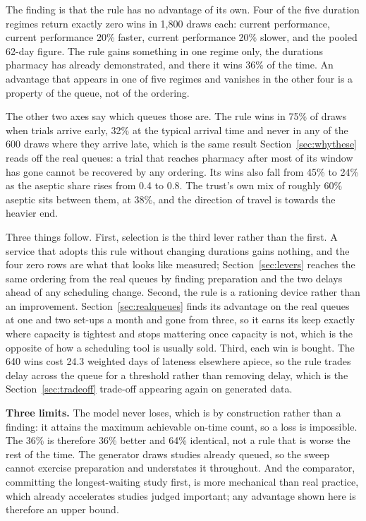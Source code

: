 The finding is that the rule has no advantage of its own. Four of the five duration regimes return exactly zero wins in 1,800 draws each: current performance, current performance 20\% faster, current performance 20\% slower, and the pooled 62-day figure. The rule gains something in one regime only, the durations pharmacy has already demonstrated, and there it wins 36\% of the time. An advantage that appears in one of five regimes and vanishes in the other four is a property of the queue, not of the ordering.

The other two axes say which queues those are. The rule wins in 75\% of draws when trials arrive early, 32\% at the typical arrival time and never in any of the 600 draws where they arrive late, which is the same result Section~\ref{sec:whythese} reads off the real queues: a trial that reaches pharmacy after most of its window has gone cannot be recovered by any ordering. Its wins also fall from 45\% to 24\% as the aseptic share rises from 0.4 to 0.8. The trust's own mix of roughly 60\% aseptic sits between them, at 38\%, and the direction of travel is towards the heavier end.

Three things follow. First, selection is the third lever rather than the first. A service that adopts this rule without changing durations gains nothing, and the four zero rows are what that looks like measured; Section~\ref{sec:levers} reaches the same ordering from the real queues by finding preparation and the two delays ahead of any scheduling change. Second, the rule is a rationing device rather than an improvement. Section~\ref{sec:realqueues} finds its advantage on the real queues at one and two set-ups a month and gone from three, so it earns its keep exactly where capacity is tightest and stops mattering once capacity is not, which is the opposite of how a scheduling tool is usually sold. Third, each win is bought. The 640 wins cost 24.3 weighted days of lateness elsewhere apiece, so the rule trades delay across the queue for a threshold rather than removing delay, which is the Section~\ref{sec:tradeoff} trade-off appearing again on generated data.

\textbf{Three limits.} The model never loses, which is by construction rather than a finding: it attains the maximum achievable on-time count, so a loss is impossible. The 36\% is therefore 36\% better and 64\% identical, not a rule that is worse the rest of the time. The generator draws studies already queued, so the sweep cannot exercise preparation and understates it throughout. And the comparator, committing the longest-waiting study first, is more mechanical than real practice, which already accelerates studies judged important; any advantage shown here is therefore an upper bound.

